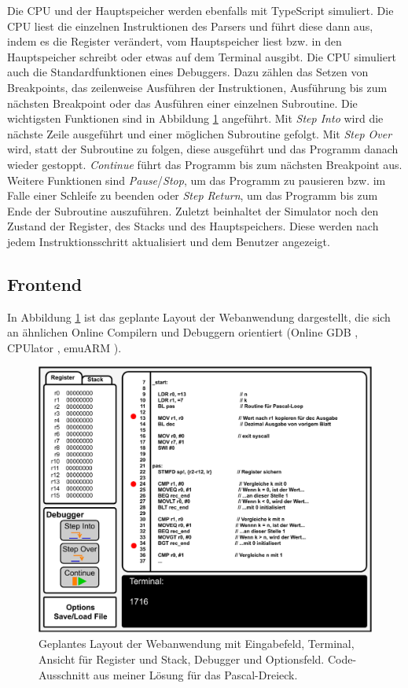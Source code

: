 \documentclass[a4paper, 11pt, onecolumn]{article}
\begin{document}
Die CPU und der Hauptspeicher werden ebenfalls mit TypeScript simuliert. Die CPU liest die einzelnen Instruktionen des Parsers und führt diese dann aus, indem es die Register verändert, vom Hauptspeicher liest bzw. in den Hauptspeicher schreibt oder etwas auf dem Terminal ausgibt. Die CPU simuliert auch die Standardfunktionen eines Debuggers. Dazu zählen das Setzen von Breakpoints, das zeilenweise Ausführen der Instruktionen, Ausführung bis zum nächsten Breakpoint oder das Ausführen einer einzelnen Subroutine. Die wichtigsten Funktionen sind in Abbildung \ref{layout} angeführt. Mit \textit{Step Into} wird die nächste Zeile ausgeführt und einer möglichen Subroutine gefolgt. Mit \textit{Step Over} wird, statt der Subroutine zu folgen, diese ausgeführt und das Programm danach wieder gestoppt. \textit{Continue} führt das Programm bis zum nächsten Breakpoint aus. Weitere Funktionen sind \textit{Pause}/\textit{Stop}, um das Programm zu pausieren bzw. im Falle einer Schleife zu beenden oder \textit{Step Return}, um das Programm bis zum Ende der Subroutine auszuführen. Zuletzt beinhaltet der Simulator noch den Zustand der Register, des Stacks und des Hauptspeichers. Diese werden nach jedem Instruktionsschritt aktualisiert und dem Benutzer angezeigt.

\subsection{Frontend}

In Abbildung \ref{layout} ist das geplante Layout der Webanwendung dargestellt, die sich an ähnlichen Online Compilern und Debuggern orientiert (Online GDB \cite{onlinegdb}, CPUlator \cite{cpulator}, emuARM \cite{emuarm}).

\begin{figure}[!htb]	
	\includegraphics[width=0.8\paperwidth]{data/layout}
	\caption{Geplantes Layout der Webanwendung mit Eingabefeld, Terminal, Ansicht für Register und Stack, Debugger und Optionsfeld. Code-Ausschnitt aus meiner Lösung für das Pascal-Dreieck.}
	\label{layout}
\end{figure}
\end{document}
